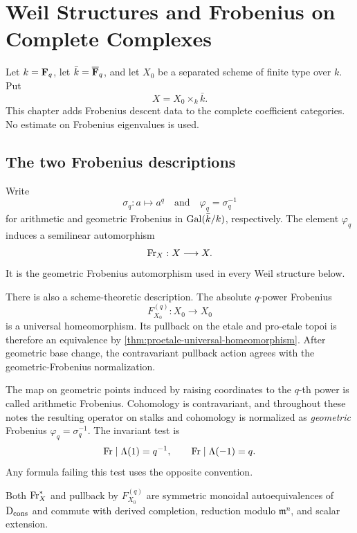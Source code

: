 \chapter{Weil Structures and Frobenius on Complete Complexes}
\label{chap:proetale-weil}

Let \(k=\mathbf F_q\), let \(\bar k=\overline{\mathbf F}_q\), and let
\(X_0\) be a separated scheme of finite type over \(k\).  Put
\[
  X=X_0\times_k\bar k.
\]
This chapter adds Frobenius descent data to the complete coefficient
categories.  No estimate on Frobenius eigenvalues is used.

\section{The two Frobenius descriptions}

Write
\[
 \sigma_q:a\longmapsto a^q
 \quad\text{and}\quad
 \varphi_q=\sigma_q^{-1}
\]
for arithmetic and geometric Frobenius in
\(\operatorname{Gal}(\bar k/k)\), respectively.  The element \(\varphi_q\) induces a
semilinear automorphism
\[
  \operatorname{Fr}_X:X\longrightarrow X.
\]
It is the geometric Frobenius automorphism used in every Weil structure
below.

There is also a scheme-theoretic description.  The absolute \(q\)-power
Frobenius
\[
  F^{(q)}_{X_0}:X_0\longrightarrow X_0
\]
is a universal homeomorphism.  Its pullback on the etale and pro-etale topoi
is therefore an equivalence by
\cref{thm:proetale-universal-homeomorphism}.  After geometric base change,
the contravariant pullback action agrees with the geometric-Frobenius
normalization.

\begin{convention}
The map on geometric points induced by raising coordinates to the
\(q\)-th power is called arithmetic Frobenius.  Cohomology is contravariant,
and throughout these notes the resulting operator on stalks and cohomology is
normalized as \emph{geometric} Frobenius \(\varphi_q=\sigma_q^{-1}\).
The invariant test is
\[
  \operatorname{Fr}\mid \Lambda(1)=q^{-1},
  \qquad
  \operatorname{Fr}\mid \Lambda(-1)=q.
\]
Any formula failing this test uses the opposite convention.
\end{convention}

\begin{proposition}
\label{prop:proetale-frobenius-equivalence}
Both \(\operatorname{Fr}_X^*\) and pullback by \(F^{(q)}_{X_0}\) are symmetric monoidal
autoequivalences of \(\mathrm D_{\mathrm{cons}}\) and commute with derived completion, reduction
modulo \(\mathfrak m^n\), and scalar extension.
\end{proposition}


